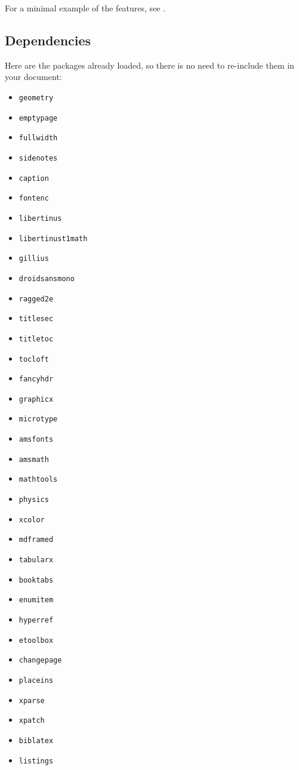 \documentclass[
	raggedright,
	12pt,
	colorful,
]{tufte-style-article}
\begin{document}
For a minimal example of the features, see .

\subsection{Dependencies}

Here are the packages already loaded, so there is no need to re-include them in your document:

\begin{wide}
\begin{multicols}{4}
\begin{itemize}
\item\texttt{geometry}
\item\texttt{emptypage}
\item\texttt{fullwidth}
\item\texttt{sidenotes}
\item\texttt{caption}
\item\texttt{fontenc}
\item\texttt{libertinus}
\item\texttt{libertinust1math}
\item\texttt{gillius}
\item\texttt{droidsansmono}
\item\texttt{ragged2e}
\item\texttt{titlesec}
\item\texttt{titletoc}
\item\texttt{tocloft}
\item\texttt{fancyhdr}
\item\texttt{graphicx} \item\texttt{microtype} \item\texttt{amsfonts} \item\texttt{amsmath} \item\texttt{mathtools} \item\texttt{physics} \item\texttt{xcolor} \item\texttt{mdframed} \item\texttt{tabularx} \item\texttt{booktabs} \item\texttt{enumitem} \item\texttt{hyperref} \item\texttt{etoolbox} \item\texttt{changepage} \item\texttt{placeins} \item\texttt{xparse} \item\texttt{xpatch} \item\texttt{biblatex} \item\texttt{listings}
\end{itemize}
\end{multicols}
\end{wide}
\end{document}
